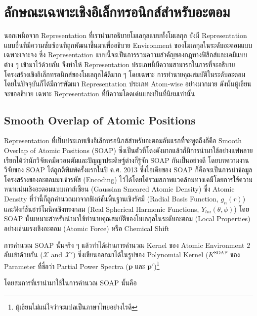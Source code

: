 \section{ลักษณะเฉพาะเชิงอิเล็กทรอนิกส์สำหรับอะตอม}

นอกเหนือจาก Representation ที่เรานำมาอธิบายโมเลกุลแบบทั้งโมเลกุล ยังมี Representation แบบอื่นที่มีความซับซ้อนที่ถูกพัฒนาขึ้นมาเพื่ออธิบาย
Environment ของโมเลกุลในระดับอะตอมแบบเฉพาะเจาะจง ซึ่ง Representation แบบนี้จะเป็นการรวมความสำคัญของกฎทางฟิสิกส์และเคมีแบบต่าง ๆ 
เข้ามาไว้ด้วยกัน จึงทำให้ Representation ประเภทนี้มีความสามารถในการที่จะอธิบายโครงสร้างเชิงอิเล็กทรอนิกส์ของโมเลกุลได้ดีมาก ๆ โดยเฉพาะ%
การทำนายคุณสมบัติในระดับอะตอม โดยในปัจจุบันก็ได้มีการพัฒนา Representation ประเภท Atom-wise อย่างมากมาย ดังนั้นผู้เขียนจะขออธิบาย%
เฉพาะ Representation ที่มีความโดดเด่นและเป็นที่นิยมเท่านั้น

\subsection{Smooth Overlap of Atomic Positions}

Representation ที่เป็นประเภทเชิงอิเล็กทรอนิกส์สำหรับอะตอมอันแรกที่จะพูดถึงก็คือ Smooth Overlap of Atomic Positions (SOAP) 
ซึ่งเป็นตัวที่โด่งดังมากแล้วก็มีการนำมาใช้อย่างแพ่หลาย เรียกได้ว่านักวิจัยเคมีควอนตัมและปัญญาประดิษฐ์ต่างก็รู้จัก SOAP กันเป็นอย่างดี
โดยบทความงานวิจัยของ SOAP ได้ถูกตีพิมพ์ครั้งแรกในปี ค.ศ. 2013 ซึ่งไอเดียของ SOAP ก็คือจะเป็นการนำข้อมูลโครงสร้างของอะตอมมาเข้ารหัส 
(Encoding) ไว้ได้โดยได้รวมสภาพแวดล้อมทางเคมีโดยการใช้ความหนาแน่นเชิงอะตอมแบบเกาส์เซียน (Gaussian Smeared Atomic Density) 
ซึ่ง Atomic Density ที่ว่านี้ก็ถูกคำนวณมาจากฟังก์ชันพื้นฐานเชิงรัศมี (Radial Basis Function, $g_{n}(r)$) และฟังก์ชันฮาร์โมนิคเชิงทรงกลม 
(Real Spherical Harmonic Functions, $Y_{lm}(\theta, \phi)$)\cite{bartok2013,de2016}
โดย SOAP นั้นเหมาะสำหรับนำมาใช้ทำนายคุณสมบัติของโมเลกุลในระดับอะตอม (Local Properties) อย่างเช่นแรงเชิงอะตอม (Atomic Force) 
หรือ Chemical Shift

การคำนวณ SOAP นั้นจริง ๆ แล้วทำได้ผ่านการคำนวณ Kernel ของ Atomic Environment 2 อันเข้าด้วยกัน ($\mathcal{X}$ and $\mathcal{X}'$)
ซึ่งเขียนออกมาได้ในรูปของ Polynomial Kernel ($K^\mathrm{SOAP}$ ของ Parameter ที่ชื่อว่า Partial Power Spectra 
($\mathbf{p}$ และ $\mathbf{p}'$)\footnote{ผู้เขียนไม่แน่ใจว่าจะแปลเป็นภาษาไทยอย่างไรดี} 

โดยสมการที่เรานำมาใช้ในการคำนวณ SOAP นั้นคือ

